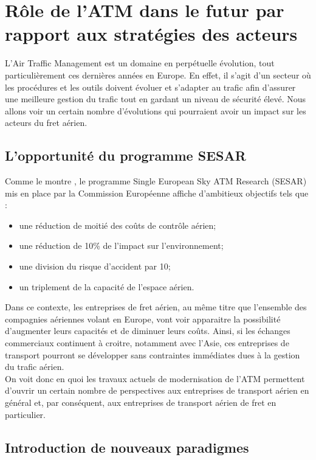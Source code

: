 
\section{Rôle de l'ATM dans le futur par rapport aux stratégies des acteurs }

L'Air Traffic Management est un domaine en perpétuelle évolution, tout particulièrement ces dernières années en Europe. En effet, il s'agit d'un secteur où les procédures et les outils doivent évoluer et s'adapter au trafic afin d'assurer une meilleure gestion du trafic tout en gardant un niveau de sécurité élevé. Nous allons voir un certain nombre d'évolutions qui pourraient avoir un impact sur les acteurs du fret aérien.

\subsection{L'opportunité du programme SESAR}

Comme le montre \cite{52008DC0750}, le programme Single European Sky ATM Research (SESAR) mis en place par la Commission Européenne affiche d'ambitieux objectifs tels que :
\begin{itemize}
\item une réduction de moitié des coûts de contrôle aérien;
\item une réduction de 10\% de l'impact sur l'environnement;
\item une division du risque d'accident par 10;
\item un triplement de la capacité de l'espace aérien.
\end{itemize}

Dans ce contexte, les entreprises de fret aérien, au même titre que l'ensemble des compagnies aériennes volant en Europe, vont voir apparaitre la possibilité d'augmenter leurs capacités et de diminuer leurs coûts. Ainsi, si les échanges commerciaux continuent à croitre, notamment avec l'Asie, ces entreprises de transport pourront se développer sans contraintes immédiates dues à la gestion du trafic aérien.\\ 

On voit donc en quoi les travaux actuels de modernisation de l'ATM permettent d'ouvrir un certain nombre de perspectives aux entreprises de transport aérien en général et, par conséquent, aux entreprises de transport aérien de fret en particulier.

\subsection{Introduction de nouveaux paradigmes}

